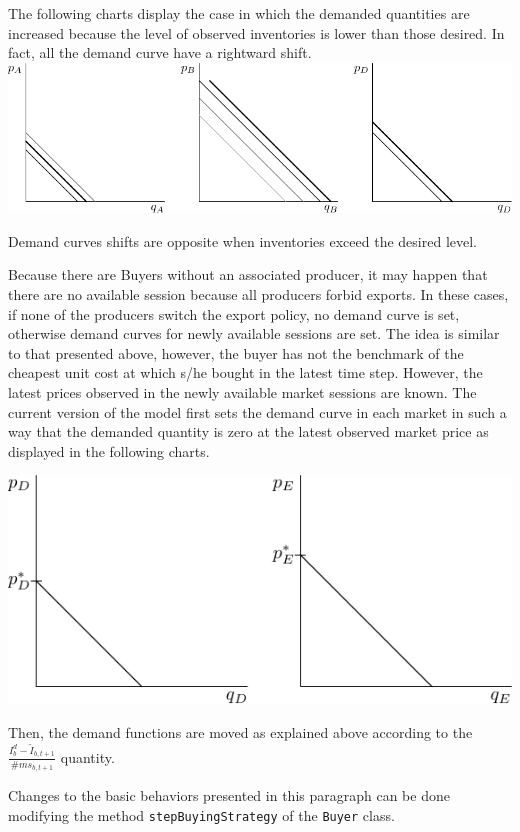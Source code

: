 \documentclass{article}
\begin{document}
The following charts display the case in which the demanded quantities are increased because the level of observed inventories is lower than those desired. In fact, all the demand curve have a rightward shift. 
\vskip5mm
\hskip-1.5cm
\includegraphics{fig_buying_strategy-4.pdf}

\vskip5mm
Demand curves shifts are opposite when inventories exceed the desired level.

Because there are Buyers without an associated producer, it may happen that there are no available session because all producers forbid exports. In these cases, if none of the producers switch the export policy, no demand curve is set, otherwise demand curves for newly available sessions are set. The idea is similar to that presented above, however, the buyer has not the benchmark of the cheapest unit cost at which s/he bought in the latest time step. However, the latest prices observed in the newly available market sessions are known. The current version of the model first sets the demand curve in each market in such a way that the demanded quantity is zero at the latest observed market price as displayed in the following charts. 

\vskip5mm
\hskip-1.5cm
\includegraphics{fig_buying_strategy-5.pdf}

\vskip5mm
Then, the demand functions are moved as explained above according to the $\frac{I^d_{b}-\tilde{I}_{b,t+1}}{\#ms_{b,t+1}}$ quantity.

Changes to the basic behaviors presented in this paragraph can be done modifying the method \verb+stepBuyingStrategy+ of the \verb+Buyer+ class.
\end{document}
